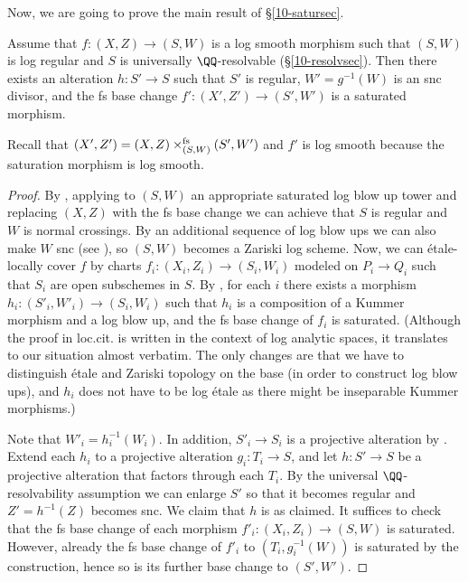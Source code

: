 \documentclass[10pt]{../fichiers-configuration-latex/smfart}
\begin{document}
Now, we are going to prove the main result of \S\ref{10-satursec}.

\begin{theorem}\label{10-saturth}
Assume that $f{\colon}(X,Z)\to(S,W)$ is a log smooth morphism such that $(S,W)$ is log regular
and $S$ is universally $\QQ$-resolvable (\S\ref{10-resolvsec}). Then there exists an alteration
$h{\colon}S'\to S$ such that $S'$ is regular, $W'=g^{-1}(W)$ is an snc divisor, and the fs base
change $f'{\colon}(X',Z')\to(S',W')$ is a saturated morphism.
\end{theorem}
Recall that $(X',Z')=(X,Z)\times_{(S,W)}^{\rm fs}(S',W')$ and $f'$ is log smooth because the
saturation morphism is log smooth.
\begin{proof}
By , applying to $(S,W)$ an appropriate saturated log blow up
tower and replacing $(X,Z)$ with the fs base change we can achieve that $S$ is regular and
$W$ is normal crossings. By an additional sequence of log blow ups we can also make $W$ snc
(see ), so $(S,W)$ becomes a Zariski log scheme. Now, we can étale-locally
cover $f$ by charts $f_i{\colon}(X_i,Z_i)\to(S_i,W_i)$ modeled on $P_i\to Q_i$ such that $S_i$ are
open subschemes in $S$. By \cite[A.4.4, A.4.3]{IKN@Quasi-unipotent}, for each $i$ there exists
a morphism $h_i{\colon}(S'_i,W'_i)\to(S_i,W_i)$ such that $h_i$ is a composition of a Kummer
morphism and a log blow up, and the fs base change of $f_i$ is saturated. (Although the proof
in loc.cit. is written in the context of log analytic spaces, it translates to our situation
almost verbatim. The only changes are that we have to distinguish étale and Zariski topology
on the base (in order to construct log blow ups), and $h_i$ does not have to be log étale as
there might be inseparable Kummer morphisms.)

Note that $W'_i=h_i^{-1}(W_i)$. In addition, $S'_i\to S_i$ is a projective alteration by
. Extend each $h_i$ to a projective alteration $g_i{\colon}T_i\to S$,
and let $h{\colon}S'\to S$ be a projective alteration that factors through each $T_i$.
By the universal $\QQ$-resolvability assumption we can enlarge $S'$ so that it becomes
regular and $Z'=h^{-1}(Z)$ becomes snc. We claim that $h$ is as claimed. It suffices to
check that the fs base change of each morphism $f'_i{\colon}(X_i,Z_i)\to(S,W)$ is saturated.
However, already the fs base change of $f'_i$ to $(T_i,g_i^{-1}(W))$ is saturated by the construction,
hence so is its further base change to $(S',W')$.
\end{proof}
\end{document}
